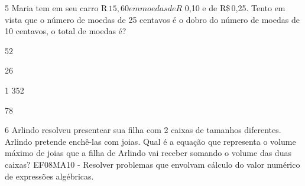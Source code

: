 







\num{5} Maria tem em seu carro R$\,15,60 em moedas de R$ 0,10 e de R\$\,0,25.
Tento em vista que o número de moedas de 25 centavos é o dobro do número
de moedas de 10 centavos, o total de moedas é?
\item 52
\item 26
\item 1 352
\item 78














\num{6} Arlindo resolveu presentear sua filha com 2 caixas de tamanhos
diferentes. Arlindo pretende enchê-las com joias. Qual é a equação que
representa o volume máximo de joias que a filha de Arlindo vai receber
somando o volume das duas caixas? EF08MA10 - Resolver problemas que
envolvam cálculo do valor numérico de expressões algébricas.

